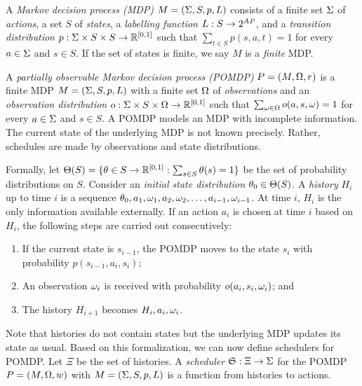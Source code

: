 
A \emph{Markov decision process (MDP)} $M = (\Sigma, S, p, L)$ consists of
a finite set $\Sigma$ of \emph{actions}, a set $S$ of \emph{states}, a
\emph{labelling function} $L : S \rightarrow 2^{\mathit{AP}}$, and 
a \emph{transition distribution} $p : \Sigma \times S \times S
\rightarrow \mathbb{R}^{[0, 1]}$ such that $\sum_{t \in S} p (s, a, t) = 1$
for every $a \in \Sigma$ and $s \in S$. If the set of states is finite,
we say $M$ is a \emph{finite} MDP.

A \emph{partially observable Markov decision process (POMDP)} $P =
(M, \Omega, r)$ is a finite MDP $M = (\Sigma, S, p, L)$ with a finite set
$\Omega$ of \emph{observations} and an \emph{observation distribution} $o
: \Sigma  \times S \times \Omega \rightarrow \mathbb{R}^{[0, 1]}$ such that $\sum_{\omega
  \in \Omega} o (a, s, \omega) = 1$ for every $a \in \Sigma$ and $s \in S$.
A POMDP models an MDP with incomplete information. The current state
of the underlying MDP is not known precisely. Rather, schedules are
made by observations and state distributions. 

Formally, let $\Theta (S) = \{ \theta \in S \rightarrow \mathbb{R}^{[0, 1]} : \sum_{s \in
 S} \theta (s) = 1 \}$ be the set of probability distributions on $S$. 
Consider an \emph{initial state distribution} $\theta_0 \in \Theta (S)$. A
\emph{history} $H_i$ up to time $i$ is a sequence $\theta_0, a_1, \omega_1,
a_2, \omega_2, \ldots, a_{i-1}, \omega_{i-1}$. At time $i$, $H_i$ is the
only information available externally. If an action $a_i$ is chosen
at time $i$ based on $H_i$, the following steps are carried out
consecutively:
\begin{enumerate}
\item If the current state is $s_{i-1}$, the POMDP moves to the state
  $s_i$ with probability $p (s_{i-1}, a_i, s_i)$;
\item An observation $\omega_i$ is received with probability $o (a_i, s_i,
  \omega_i)$; and
\item The history $H_{i+1}$ becomes $H_i, a_i, \omega_i$.
\end{enumerate}
Note that histories do not contain states but the underlying MDP
updates its state as usual. Based on this formalization, we can now
define schedulers for POMDP. Let $\Xi$ be the set of histories. A
\emph{scheduler} $\mathfrak{S} : \Xi \rightarrow \Sigma$ for the POMDP $P
= (M, \Omega, w)$ with $M = (\Sigma, S, p, L)$ is a function
from histories to actions. 

